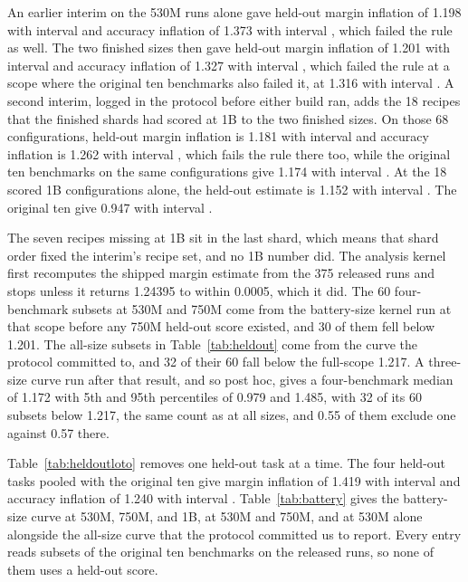 An earlier interim on the 530M runs alone gave held-out margin inflation of 1.198 with interval  and accuracy inflation of 1.373 with interval , which failed the rule as well. The two finished sizes then gave held-out margin inflation of 1.201 with interval  and accuracy inflation of 1.327 with interval , which failed the rule at a scope where the original ten benchmarks also failed it, at 1.316 with interval . A second interim, logged in the protocol before either build ran, adds the 18 recipes that the finished shards had scored at 1B to the two finished sizes. On those 68 configurations, held-out margin inflation is 1.181 with interval  and accuracy inflation is 1.262 with interval , which fails the rule there too, while the original ten benchmarks on the same configurations give 1.174 with interval . At the 18 scored 1B configurations alone, the held-out estimate is 1.152 with interval . The original ten give 0.947 with interval .

The seven recipes missing at 1B sit in the last shard, which means that shard order fixed the interim's recipe set, and no 1B number did. The analysis kernel first recomputes the shipped margin estimate from the 375 released runs and stops unless it returns 1.24395 to within 0.0005, which it did. The 60 four-benchmark subsets at 530M and 750M come from the battery-size kernel run at that scope before any 750M held-out score existed, and 30 of them fell below 1.201. The all-size subsets in Table~\ref{tab:heldout} come from the curve the protocol committed to, and 32 of their 60 fall below the full-scope 1.217. A three-size curve run after that result, and so post hoc, gives a four-benchmark median of 1.172 with 5th and 95th percentiles of 0.979 and 1.485, with 32 of its 60 subsets below 1.217, the same count as at all sizes, and 0.55 of them exclude one against 0.57 there.

Table~\ref{tab:heldoutloto} removes one held-out task at a time. The four held-out tasks pooled with the original ten give margin inflation of 1.419 with interval  and accuracy inflation of 1.240 with interval . Table~\ref{tab:battery} gives the battery-size curve at 530M, 750M, and 1B, at 530M and 750M, and at 530M alone alongside the all-size curve that the protocol committed us to report. Every entry reads subsets of the original ten benchmarks on the released runs, so none of them uses a held-out score.


